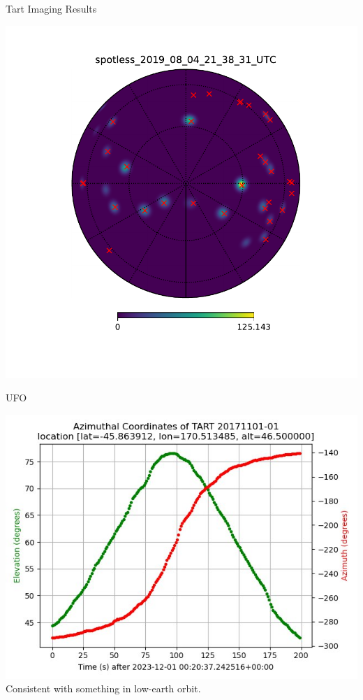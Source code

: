 \documentclass[ignorenonframetext]{beamer}
\begin{document}
\begin{frame}{Tart Imaging Results}
\begin{center}
\includegraphics[width=0.6\linewidth]{fig/tart_snapshot.pdf}\\
 \end{center}
\end{frame}

\begin{frame}{UFO}
\begin{center}
\includegraphics[width=0.8\linewidth]{fig/elaz.jpg}\\
 Consistent with something in low-earth orbit.
 \end{center}
\end{frame}
\end{document}
